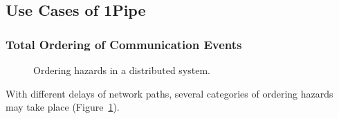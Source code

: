 \subsection{Use Cases of 1Pipe}
\label{subsec:application}

\subsubsection{Total Ordering of Communication Events}
\label{subsec:order-hazards}

\begin{figure}[t]
\centering
    \hspace{0.02\textwidth}
	\caption{Ordering hazards in a distributed system.}
	\label{fig:ordering}
\end{figure}


With different delays of network paths, several categories of ordering hazards~\cite{gharachorloo1990memory,sewell2010x86} may take place (Figure~\ref{fig:ordering}).

